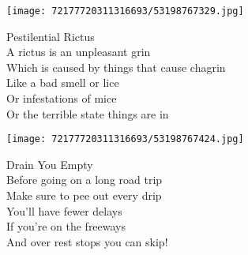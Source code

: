 \documentclass[10pt,letterpaper]{article}
\begin{document}
\begin{center}
\texttt{[image: 72177720311316693/53198767329.jpg]}
\end{center}

\begin{center}
Pestilential Rictus\\
\vskip 0.2in
A rictus is an unpleasant grin\\
Which is caused by things that cause chagrin\\
Like a bad smell or lice\\
Or infestations of mice\\
Or the terrible state things are in\\
\end{center}
\pagebreak

\begin{center}
\texttt{[image: 72177720311316693/53198767424.jpg]}
\end{center}

\begin{center}
Drain You Empty\\
\vskip 0.2in
Before going on a long road trip\\
Make sure to pee out every drip\\
You'll have fewer delays\\
If you're on the freeways\\
And over rest stops you can skip!\\
\end{center}
\pagebreak
\end{document}
